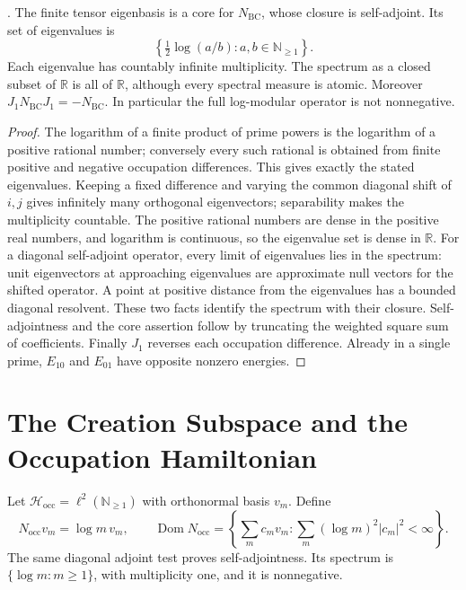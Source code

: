\begin{theorem}
\label{v4-arith:w5-b:thm:N-BC-self-adjoint}
\ClaimStatusProvedHere. The finite tensor eigenbasis is a core
for $N_{\mathrm{BC}}$, whose closure is self-adjoint. Its
set of eigenvalues is
\[
 \left\{\tfrac12\log(a/b):a,b\in\mathbb N_{\geq1}\right\}.
\]
Each eigenvalue has countably infinite multiplicity. The spectrum
as a closed subset of $\mathbb R$ is all of $\mathbb R$,
although every spectral measure is atomic. Moreover
$J_1N_{\mathrm{BC}}J_1=-N_{\mathrm{BC}}$.
In particular the full log-modular operator is not nonnegative.
\end{theorem}

\begin{proof}
The logarithm of a finite product of prime powers is the
logarithm of a positive rational number; conversely every such
rational is obtained from finite positive and negative occupation
differences. This gives exactly the stated eigenvalues. Keeping
a fixed difference and varying the common diagonal shift of
$i,j$ gives infinitely many orthogonal eigenvectors; separability
makes the multiplicity countable. The positive rational numbers
are dense in the positive real numbers, and logarithm is
continuous, so the eigenvalue set is dense in $\mathbb R$.
For a diagonal self-adjoint operator, every limit of eigenvalues
lies in the spectrum: unit eigenvectors at approaching eigenvalues
are approximate null vectors for the shifted operator. A point
at positive distance from the eigenvalues has a bounded diagonal
resolvent. These two facts identify the spectrum with their
closure. Self-adjointness and the core assertion follow by
truncating the weighted square sum of coefficients.
Finally $J_1$ reverses each occupation difference. Already in a
single prime, $E_{10}$ and $E_{01}$ have opposite nonzero energies.
\end{proof}

\section{The Creation Subspace and the Occupation Hamiltonian}
\label{v4-arith:w5-b:primary-heisenberg}

Let $\mathcal H_{\mathrm{occ}}=\ell^2(\mathbb N_{\geq1})$
with orthonormal basis $v_m$. Define
\[
 N_{\mathrm{occ}}v_m=\log m\,v_m,\qquad
 \operatorname{Dom}N_{\mathrm{occ}}
   =\left\{\sum_m c_mv_m:\sum_m(\log m)^2|c_m|^2<\infty\right\}.
\]
The same diagonal adjoint test proves self-adjointness. Its
spectrum is $\{\log m:m\geq1\}$, with multiplicity one, and
it is nonnegative.

